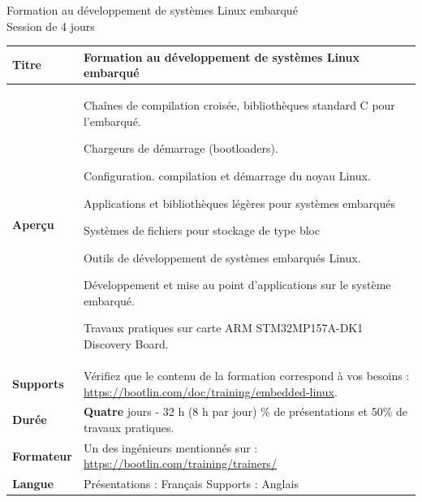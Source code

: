 \documentclass[a4paper,12pt,obeyspaces,spaces,hyphens]{article}
\begin{document}
\thispagestyle{fancy}

\setlength{\arrayrulewidth}{0.8pt}

\begin{center}
\LARGE
Formation au développement de systèmes Linux embarqué\\
\large
Session de 4 jours
\end{center}
\vspace{1cm}

\small
{}

 {
  \begin{tabularx}{\textwidth}{|g|h|}
    {\bf Titre} & {\bf Formation au développement de systèmes Linux embarqué} \\
    \hline

    {\bf Aperçu} &
Chaînes de compilation croisée, bibliothèques standard C pour l'embarqué. \par
Chargeurs de démarrage (bootloaders). \par
Configuration. compilation et démarrage du noyau Linux. \par
Applications et bibliothèques légères pour systèmes embarqués \par
Systèmes de fichiers pour stockage de type bloc \par
Outils de développement de systèmes embarqués Linux. \par
Développement et mise au point d'applications sur le système embarqué. \par
Travaux pratiques sur carte ARM STM32MP157A-DK1 Discovery Board. \\
    \hline
    {\bf Supports} &
    Vérifiez que le contenu de la formation correspond à vos besoins :
    \newline \url{https://bootlin.com/doc/training/embedded-linux}. \\
    \hline

    {\bf Durée} & {\bf Quatre} jours - 32 h (8 h par jour)
    \% de présentations et 50\% de travaux pratiques. \\
    \hline

    {\bf Formateur} & Un des ingénieurs mentionnés sur :
    \newline \url{https://bootlin.com/training/trainers/}\\
    \hline

    {\bf Langue} & Présentations : Français
    \newline Supports : Anglais\\
    \hline


\end{tabularx}}
\end{document}
